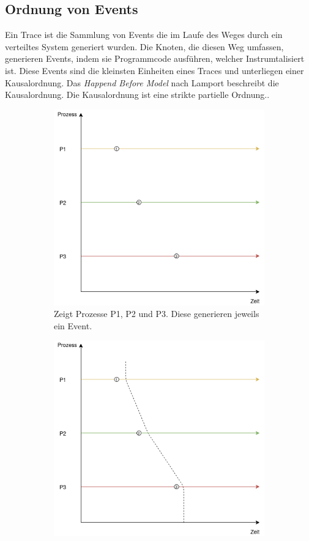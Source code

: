 \subsection{Ordnung von Events}
\label{subsection:Ordnung von Events}
	
Ein Trace ist die Sammlung von Events die im Laufe des Weges durch ein verteiltes System generiert wurden. Die Knoten, die diesen Weg umfassen, generieren Events, indem sie Programmcode ausführen, welcher Instrumtalisiert ist. Diese Events sind die kleinsten Einheiten eines Traces und unterliegen einer Kausalordnung. Das \emph{Happend Before Model} nach Lamport beschreibt die Kausalordnung. Die Kausalordnung ist eine strikte partielle Ordnung.. 

\begin{figure}[!ht]
	\centering
	\begin{subfigure}[t]{.49\linewidth}
		\centering\includegraphics[width=.8\linewidth]{img/Themenueberblick/PartialOrdering_Concurrent.png}
		\caption[Abbildung]{Zeigt Prozesse P1, P2 und P3. Diese generieren jeweils ein Event.}
		\label{fig:Partial_Ordering_Concurrent_explained_1}
	\end{subfigure}
	\begin{subfigure}[t]{.49\linewidth}
		\centering\includegraphics[width=.8\linewidth]{img/Themenueberblick/PartialOrdering_Concurrent_Explained}

\end{subfigure}
\end{figure}
